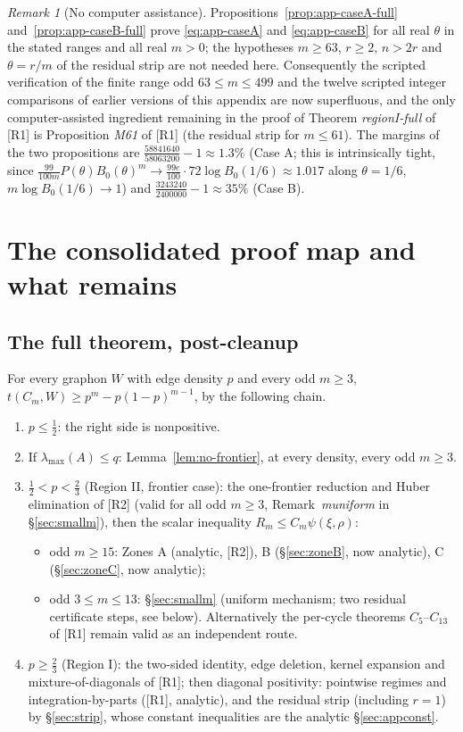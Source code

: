 \documentclass[11pt]{article}
\theoremstyle{remark}
\newtheorem{remark}[theorem]{Remark}
\theoremstyle{plain}
\theoremstyle{plain}
\begin{document}
\begin{remark}[No computer assistance]\label{rmk:app-no-computer}
Propositions~\ref{prop:app-caseA-full} and~\ref{prop:app-caseB-full} prove
\eqref{eq:app-caseA} and \eqref{eq:app-caseB} for all real $\theta$ in the
stated ranges and all real $m>0$; the hypotheses $m\ge63$, $r\ge2$, $n>2r$
and $\theta=r/m$ of the residual strip are not needed here.  Consequently
the scripted verification of the finite range odd $63\le m\le499$ and the
twelve scripted integer comparisons of earlier versions of this appendix are
now superfluous, and the only computer-assisted ingredient remaining in the
proof of Theorem \emph{regionI-full} of [R1] is Proposition \emph{M61} of [R1]
(the residual strip for $m\le61$).  The margins of the two propositions are
$\frac{58841640}{58063200}-1\approx1.3\%$ (Case A; this is intrinsically
tight, since $\frac{99}{100m}P(\theta)B_0(\theta)^m\to\frac{99e}{100}\cdot
72\log B_0(1/6)\approx1.017$ along $\theta=1/6$, $m\log B_0(1/6)\to1$) and
$\frac{3243240}{2400000}-1\approx35\%$ (Case B).
\end{remark}
\section{The consolidated proof map and what remains}\label{sec:map}

\subsection*{The full theorem, post-cleanup}

For every graphon $W$ with edge density $p$ and every odd $m\ge3$,
$t(C_m,W)\ge p^m-p(1-p)^{m-1}$, by the following chain.
\begin{enumerate}[label=\textup{(\arabic*)},itemsep=2pt]
\item $p\le\tfrac12$: the right side is nonpositive.
\item If $\lambda_{\max}(A)\le q$: Lemma~\ref{lem:no-frontier}, at every
density, every odd $m\ge3$.
\item $\tfrac12<p<\tfrac23$ (Region II, frontier case): the one-frontier
reduction and Huber elimination of [R2] (valid for all odd $m\ge3$,
Remark~\emph{muniform} in \S\ref{sec:smallm}), then the scalar inequality
$R_m\le C_m\psi(\xi,\rho)$:
  \begin{itemize}[leftmargin=1.5em]
  \item odd $m\ge15$: Zones A (analytic, [R2]), B
  (\S\ref{sec:zoneB}, now analytic), C (\S\ref{sec:zoneC}, now analytic);
  \item odd $3\le m\le13$: \S\ref{sec:smallm} (uniform mechanism; two
  residual certificate steps, see below).  Alternatively the per-cycle
  theorems $C_5$--$C_{13}$ of [R1] remain valid as an independent route.
  \end{itemize}
\item $p\ge\tfrac23$ (Region I): the two-sided identity, edge deletion,
kernel expansion and mixture-of-diagonals of [R1]; then diagonal
positivity: pointwise regimes and integration-by-parts ([R1], analytic),
and the residual strip (including $r=1$) by \S\ref{sec:strip}, whose
constant inequalities are the analytic \S\ref{sec:appconst}.
\end{enumerate}
\end{document}

